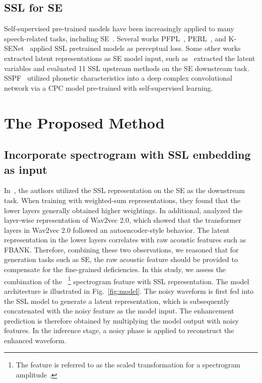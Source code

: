 \documentclass[a4paper]{article}
\begin{document}
\subsection{SSL for SE}
Self-supervised pre-trained models have been increasingly applied to many speech-related tasks, including SE~\cite{wang2020self, 9053925}. Several works PFPL~\cite{hsieh2020improving}, PERL~\cite{kataria2021perceptual}, and K-SENet~\cite{sun2021boosting} applied SSL pretrained models as perceptual loss.
Some other works extracted latent representations as SE model input, such as~\cite{ZiliSSL,tsai2022superb} extracted the latent variables and evaluated 11 SSL upstream methods on the SE downstream task. SSPF~\cite{qiu2021self} utilized phonetic characteristics into a
deep complex convolutional network via a CPC model pre-trained with self-supervised
learning.





\section{The Proposed Method}

\subsection{Incorporate spectrogram with SSL embedding as input}
In~\cite{ZiliSSL}, the authors utilized the SSL representation on the SE as the downstream task. When training with weighted-sum representations, they found that the lower layers generally obtained higher weightings. In additional, \cite{9688093} analyzed the layer-wise representation of Wav2vec 2.0, which showed that the transformer layers in Wav2vec 2.0 followed an autoencoder-style behavior. The latent representation in the lower layers correlates with raw acoustic features such as FBANK. Therefore, combining these two observations, we reasoned that for generation tasks such as SE, the raw acoustic feature should be provided to compensate for the fine-grained deficiencies. In this study, we assess the combination of the ~\cite{fu2020boosting}\footnote{The  feature is referred to as the scaled transformation  for a spectrogram amplitude .} spectrogram feature with SSL representation. The model architecture is illustrated in Fig.~\ref{fig:model}. The noisy waveform is first fed into the SSL model to generate a latent representation, which is subsequently concatenated with the noisy  feature as the model input. The enhancement prediction is therefore obtained by multiplying the model output with noisy  features. In the inference stage, a noisy phase is applied to reconstruct the enhanced waveform.
\end{document}
